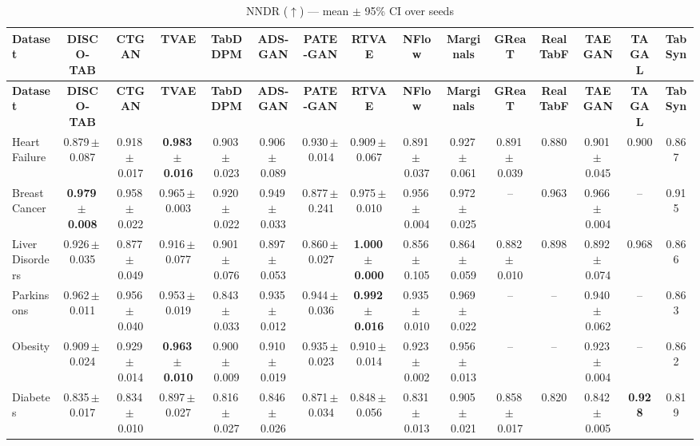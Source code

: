 \documentclass[8pt]{extarticle}
\begin{document}
\begin{longtable}{l*{14}{c}}
\caption{NNDR ($\uparrow$) --- mean $\pm$ 95\% CI over seeds}\\
\toprule
\textbf{Dataset} & \textbf{DISCO-TAB} & \textbf{CTGAN} & \textbf{TVAE} & \textbf{TabDDPM} & \textbf{ADS-GAN} & \textbf{PATE-GAN} & \textbf{RTVAE} & \textbf{NFlow} & \textbf{Marginals} & \textbf{GReaT} & \textbf{RealTabF} & \textbf{TAEGAN} & \textbf{TAGAL} & \textbf{TabSyn} \\
\midrule
\endfirsthead
\toprule
\textbf{Dataset} & \textbf{DISCO-TAB} & \textbf{CTGAN} & \textbf{TVAE} & \textbf{TabDDPM} & \textbf{ADS-GAN} & \textbf{PATE-GAN} & \textbf{RTVAE} & \textbf{NFlow} & \textbf{Marginals} & \textbf{GReaT} & \textbf{RealTabF} & \textbf{TAEGAN} & \textbf{TAGAL} & \textbf{TabSyn} \\
\midrule
\endhead
\bottomrule
\endfoot
Heart Failure & 0.879\,$\pm$\,0.087 & 0.918\,$\pm$\,0.017 & \textbf{0.983\,$\pm$\,0.016} & 0.903\,$\pm$\,0.023 & 0.906\,$\pm$\,0.089 & 0.930\,$\pm$\,0.014 & 0.909\,$\pm$\,0.067 & 0.891\,$\pm$\,0.037 & 0.927\,$\pm$\,0.061 & 0.891\,$\pm$\,0.039 & 0.880 & 0.901\,$\pm$\,0.045 & 0.900 & 0.867 \\
Breast Cancer & \textbf{0.979\,$\pm$\,0.008} & 0.958\,$\pm$\,0.022 & 0.965\,$\pm$\,0.003 & 0.920\,$\pm$\,0.022 & 0.949\,$\pm$\,0.033 & 0.877\,$\pm$\,0.241 & 0.975\,$\pm$\,0.010 & 0.956\,$\pm$\,0.004 & 0.972\,$\pm$\,0.025 & -- & 0.963 & 0.966\,$\pm$\,0.004 & -- & 0.915 \\
Liver Disorders & 0.926\,$\pm$\,0.035 & 0.877\,$\pm$\,0.049 & 0.916\,$\pm$\,0.077 & 0.901\,$\pm$\,0.076 & 0.897\,$\pm$\,0.053 & 0.860\,$\pm$\,0.027 & \textbf{1.000\,$\pm$\,0.000} & 0.856\,$\pm$\,0.105 & 0.864\,$\pm$\,0.059 & 0.882\,$\pm$\,0.010 & 0.898 & 0.892\,$\pm$\,0.074 & 0.968 & 0.866 \\
Parkinsons & 0.962\,$\pm$\,0.011 & 0.956\,$\pm$\,0.040 & 0.953\,$\pm$\,0.019 & 0.843\,$\pm$\,0.033 & 0.935\,$\pm$\,0.012 & 0.944\,$\pm$\,0.036 & \textbf{0.992\,$\pm$\,0.016} & 0.935\,$\pm$\,0.010 & 0.969\,$\pm$\,0.022 & -- & -- & 0.940\,$\pm$\,0.062 & -- & 0.863 \\
Obesity & 0.909\,$\pm$\,0.024 & 0.929\,$\pm$\,0.014 & \textbf{0.963\,$\pm$\,0.010} & 0.900\,$\pm$\,0.009 & 0.910\,$\pm$\,0.019 & 0.935\,$\pm$\,0.023 & 0.910\,$\pm$\,0.014 & 0.923\,$\pm$\,0.002 & 0.956\,$\pm$\,0.013 & -- & -- & 0.923\,$\pm$\,0.004 & -- & 0.862 \\
Diabetes & 0.835\,$\pm$\,0.017 & 0.834\,$\pm$\,0.010 & 0.897\,$\pm$\,0.027 & 0.816\,$\pm$\,0.027 & 0.846\,$\pm$\,0.026 & 0.871\,$\pm$\,0.034 & 0.848\,$\pm$\,0.056 & 0.831\,$\pm$\,0.013 & 0.905\,$\pm$\,0.021 & 0.858\,$\pm$\,0.017 & 0.820 & 0.842\,$\pm$\,0.005 & \textbf{0.928} & 0.819 \\

\end{longtable}
\end{document}
